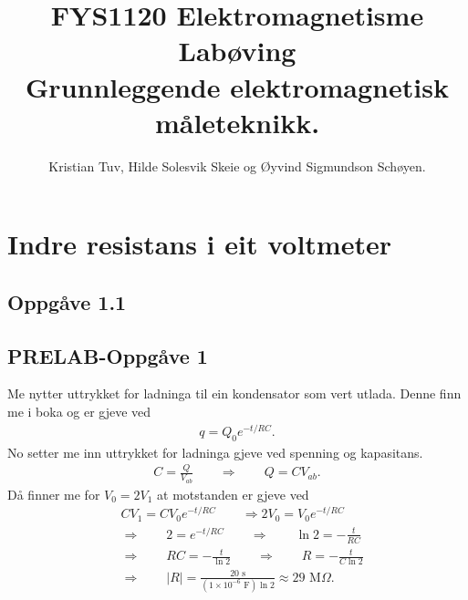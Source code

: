 \documentclass[11pt, a4paper]{article}
\begin{document}
\begin{titlepage}

  \title{\normalsize FYS1120 Elektromagnetisme\\
    \vspace{10mm}
    \huge Labøving\\
    \vspace{10mm}
    \normalsize{\bf Grunnleggende elektromagnetisk måleteknikk.}}

  \author{Kristian Tuv, Hilde Solesvik Skeie og Øyvind Sigmundson Schøyen.}

\end{titlepage}

\maketitle

\newpage
  \tableofcontents
\newpage

\section*{Indre resistans i eit voltmeter}

  \subsection*{Oppgåve 1.1}

  \subsection*{PRELAB-Oppgåve 1}
    Me nytter uttrykket for ladninga til ein kondensator som vert utlada. Denne finn me i boka og er gjeve ved
    \begin{align*}
      q = Q_0e^{-t/RC}.
    \end{align*}
    No setter me inn uttrykket for ladninga gjeve ved spenning og kapasitans.
    \begin{align*}
      C = \frac{Q}{V_{ab}} \qquad \Rightarrow \qquad Q = CV_{ab}.
    \end{align*}
    Då finner me for $V_0 = 2V_1$ at motstanden er gjeve ved
    \begin{align*}
      &CV_1 = CV_0e^{-t/RC} \qquad \Rightarrow 2V_0 = V_0e^{-t/RC} \\
      &\Rightarrow \qquad 2 = e^{-t/RC} \qquad \Rightarrow \qquad \ln{2} = -\frac{t}{RC} \\
      &\Rightarrow \qquad RC = -\frac{t}{\ln{2}} \qquad \Rightarrow \qquad R = -\frac{t}{C\ln{2}} \\
      &\Rightarrow \qquad |R| = \frac{20\text{ s}}{(1\times10^{-6}\text{ F})\ln{2}} \approx 29\text{ M}\Omega.
    \end{align*}
\end{document}
